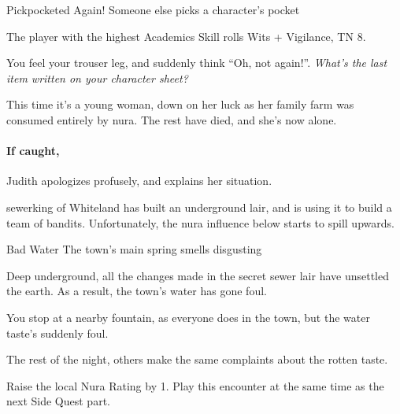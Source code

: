 \begin{multicols}{2}
\warningbard

{Pickpocketed Again!}%
{Someone else picks a character's pocket}%

The player with the highest Academics Skill rolls Wits + Vigilance, TN 8.

\begin{boxtext}

	You feel your trouser leg, and suddenly think ``Oh, not again!''.  \textit{What's the last item written on your character sheet?}

\end{boxtext}

This time it's a young woman, down on her luck as her family farm was consumed entirely by nura.
The rest have died, and she's now alone.

\paragraph{If caught,}
Judith apologizes profusely, and explains her situation.


\stopcontents[sq]

\label{sewerbandits}

\startcontents[sq]

\sqminitoc

\Gls{sewerking} of Whiteland has built an underground lair, and is using it to build a team of bandits.
Unfortunately, the nura influence below starts to spill upwards.

{\N Bad Water}%
{The town's main spring smells disgusting}%

Deep underground, all the changes made in the secret sewer lair have unsettled the earth.
As a result, the town's water has gone foul.

\begin{boxtext}

	You stop at a nearby fountain, as everyone does in the town, but the water taste's suddenly foul.

	The rest of the night, others make the same complaints about the rotten taste.

\end{boxtext}

Raise the local Nura Rating by 1.
Play this encounter at the same time as the next Side Quest part.


\end{multicols}
